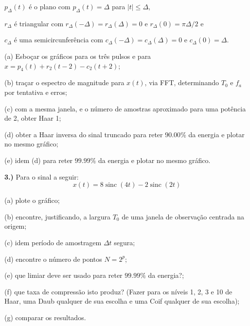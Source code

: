 \documentclass[10pt]{article}
\DeclareMathOperator{\sinc}{sinc}
\begin{document}
$p_{\Delta}(t)$ é o plano com $p_{\Delta}(t) = \Delta$ para $|t| \leq \Delta$,

$r_{\Delta}$ é triangular com $r_{\Delta}(-\Delta) = r_{\Delta}(\Delta) = 0$ e $r_{\Delta}(0) = \pi \Delta / 2$ e

$c_{\Delta}$ é uma semicircunferência com $c_{\Delta}(-\Delta) = c_{\Delta}(\Delta) = 0$ e $c_{\Delta}(0) = \Delta$.

\vspace{\baselineskip}

(a) Esboçar os gráficos para os três pulsos e para $x = p_4(t) + r_2(t - 2) - c_2(t + 2)$;

(b) traçar o espectro de magnitude para $x(t)$, via FFT, determinando $T_0$ e $f_a$ por tentativa e erros;

(c) com a mesma janela, e o número de amostras aproximado para uma potência de 2, obter Haar 1;

(d) obter a Haar inversa do sinal truncado para reter $90.00\%$ da energia e plotar no mesmo gráfico;

(e) idem (d) para reter $99.99\%$ da energia e plotar no mesmo gráfico.


\vspace{\baselineskip}


\textbf{3.)} Para o sinal a seguir:
\[x(t) = 8\sinc(4t) - 2\sinc(2t)\]

(a) plote o gráfico;

(b) encontre, justificando, a largura $T_0$ de uma janela de observação centrada na origem;

(c) idem período de amostragem $\Delta t$ segura;

(d) encontre o número de pontos $N = 2^p$;

(e) que limiar deve ser usado para reter $99.99\%$ da energia?;

(f) que taxa de compressão isto produz? (Fazer para os níveis 1, 2, 3 e 10 de Haar, uma Daub qualquer de sua escolha e uma Coif qualquer de sua escolha);

(g) comparar os resultados.
\end{document}
